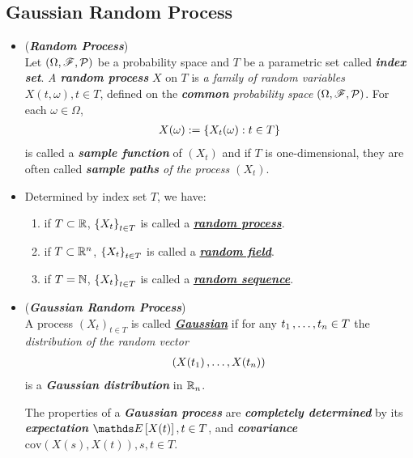 \documentclass[11pt]{article}
\begin{document}
\subsection{Gaussian Random Process}
\begin{itemize}
\item \begin{definition} (\emph{\textbf{Random Process}})\\
Let $(\Omega, {\mathscr F}, {\mathcal P})$ be a probability space and $T$ be a parametric set called \emph{\textbf{index set}}. \emph{A \textbf{random process}} $X$ on $T$ is
\emph{a family of random variables $X(t, \omega), t \in T$}, defined on the \emph{\textbf{common} probability space} $(\Omega, {\mathscr F}, {\mathcal P})$. For each $\omega \in \Omega$,
\begin{align*}
X(\omega) := \left\{X_t(\omega): t\in T\right\}
\end{align*} is called a \emph{\textbf{sample function}} of $(X_t)$ and if $T$ is one-dimensional, they
are often called \emph{\textbf{sample paths} of the process $(X_t)$}.
\end{definition}

\item \begin{remark}
Determined by index set $T$, we have:
\begin{enumerate}
\item if $T \subset {\mathbb R}$, $\left\{X_t\right\}_{t\in T}$ is called a \underline{\emph{\textbf{random process}}}.
\item if $T \subset {\mathbb R}^n$, $\left\{X_t\right\}_{t\in T}$ is called a \underline{\emph{\textbf{random field}}}.
\item if $T = {\mathbb N}$, $\left\{X_t\right\}_{t\in T}$ is called a \underline{\emph{\textbf{random sequence}}}.
\end{enumerate}
\end{remark}

\item \begin{definition} (\emph{\textbf{Gaussian Random Process}})\\
A process $(X_t)_{t\in T}$ is called \underline{\emph{\textbf{Gaussian}}} if for any $t_1 \,{,}\ldots{,}\, t_n \in T$ the \emph{distribution of the random vector}
\begin{align*}
\left(X(t_1) \,{,}\ldots{,}\, X(t_n)\right)
\end{align*}
is a \emph{\textbf{Gaussian distribution}} in ${\mathbb R}_n$. 

The properties of a \emph{\textbf{Gaussian process}} are \emph{\textbf{completely determined}} by its \emph{\textbf{expectation}} $\E{}{X(t)}, t \in T$,
and \emph{\textbf{covariance}} $\text{cov}(X(s), X(t)), s, t \in T$.
\end{definition}


\end{itemize}
\end{document}
